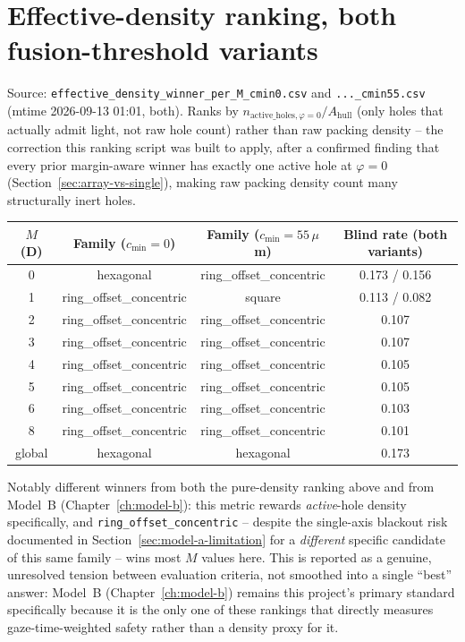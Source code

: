 \section{Effective-density ranking, both fusion-threshold variants}
\label{sec:eff-density-full}
Source: \texttt{effective\_density\_winner\_per\_M\_cmin0.csv} and
\texttt{...\_cmin55.csv} (mtime 2026-09-13 01:01, both). Ranks by
$n_{\mathrm{active\_holes},\varphi=0}/A_{\mathrm{hull}}$ (only holes that actually admit
light, not raw hole count) rather than raw packing density -- the correction this
ranking script was built to apply, after a confirmed finding that every prior
margin-aware winner has exactly one active hole at $\varphi=0$
(Section~\ref{sec:array-vs-single}), making raw packing density count many structurally
inert holes.

\begin{center}
\begin{tabular}{cccc}
\toprule
$M$ (D) & Family ($c_{\min}=0$) & Family ($c_{\min}=55\,\mu$m) & Blind rate (both variants) \\
\midrule
0 & hexagonal & ring\_offset\_concentric & 0.173 / 0.156 \\
1 & ring\_offset\_concentric & square & 0.113 / 0.082 \\
2 & ring\_offset\_concentric & ring\_offset\_concentric & 0.107 \\
3 & ring\_offset\_concentric & ring\_offset\_concentric & 0.107 \\
4 & ring\_offset\_concentric & ring\_offset\_concentric & 0.105 \\
5 & ring\_offset\_concentric & ring\_offset\_concentric & 0.105 \\
6 & ring\_offset\_concentric & ring\_offset\_concentric & 0.103 \\
8 & ring\_offset\_concentric & ring\_offset\_concentric & 0.101 \\
global & hexagonal & hexagonal & 0.173 \\
\bottomrule
\end{tabular}
\end{center}
Notably different winners from both the pure-density ranking above and from
Model~B (Chapter~\ref{ch:model-b}): this metric rewards \emph{active}-hole density
specifically, and \texttt{ring\_offset\_concentric} -- despite the single-axis
blackout risk documented in Section~\ref{sec:model-a-limitation} for a
\emph{different} specific candidate of this same family -- wins most $M$ values here.
This is reported as a genuine, unresolved tension between evaluation criteria, not
smoothed into a single ``best'' answer: Model~B (Chapter~\ref{ch:model-b}) remains this
project's primary standard specifically because it is the only one of these rankings
that directly measures gaze-time-weighted safety rather than a density proxy for it.

